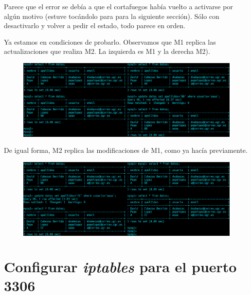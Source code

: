 \documentclass{article}
\begin{document}
Parece que el error se debía a que el cortafuegos había vuelto a activarse por algún motivo (estuve tocándolo
para para la siguiente sección). Sólo con desactivarlo y volver a pedir el estado, todo parece en orden.
\begin{figure}[H]
	\centering
\end{figure}

Ya estamos en condiciones de probarlo. Observamos que M1 replica las actualizaciones que realiza M2.
La izquierda es M1 y la derecha M2).
\begin{figure}[H]
	\centering
	\includegraphics[width=180mm]{imgs/test-m2}
\end{figure}

De igual forma, M2 replica las modificaciones de M1, como ya hacía previamente.
\begin{figure}[H]
	\centering
	\includegraphics[width=180mm]{imgs/test-m1}
\end{figure}

\section{Configurar \emph{iptables} para el puerto 3306}
\end{document}
